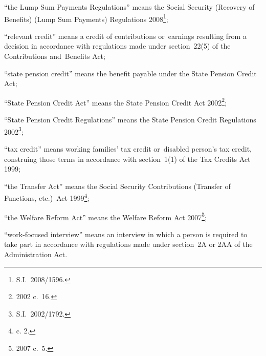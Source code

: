 \documentclass[12pt,a4paper]{article}
\begin{document}
\begin{enumerate}
“the Lump Sum Payments Regulations” means the Social Security (Recovery of Benefits) (Lump Sum Payments) Regulations 2008\footnote{S.I.~2008/1596.};

“relevant credit” means a credit of contributions or~earnings resulting from a decision in accordance with regulations made under section~22(5) of the Contributions and~Benefits Act;

“state pension credit” means the benefit payable under the State Pension Credit Act;

“State Pension Credit Act” means the State Pension Credit Act 2002\footnote{2002 c.~16.};

“State Pension Credit Regulations” means the State Pension Credit Regulations 2002\footnote{S.I.~2002/1792.};

“tax credit” means working families' tax credit or~disabled person’s tax credit, construing those terms in accordance with section~1(1) of the Tax Credits Act 1999;

“the Transfer Act” means the Social Security Contributions (Transfer of Functions, etc.)\ Act 1999\footnote{ c. 2.};

“the Welfare Reform Act” means the Welfare Reform Act 2007\footnote{2007 c.~5.};



“work-focused interview” means an interview in which a person is required to take part in accordance with regulations made under section~2A or 2AA of the Administration Act.

\end{enumerate}
\end{document}
